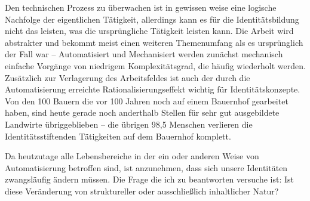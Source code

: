 Den technischen Prozess zu überwachen ist in gewissen weise eine logische Nachfolge der eigentlichen Tätigkeit, allerdings kann es für die Identitätsbildung nicht das leisten, was die ursprüngliche Tätigkeit leisten kann.
Die Arbeit wird abstrakter und bekommt meist einen weiteren Themenumfang als es ursprünglich der Fall war \parencite{ulrich} – Automatisiert und Mechanisiert werden zunächst mechanisch einfache Vorgänge von niedrigem Komplexitätsgrad, die häufig wiederholt werden.
Zusätzlich zur Verlagerung des Arbeitsfeldes ist auch der durch die Automatisierung erreichte Rationalisierungseffekt wichtig für Identitätskonzepte.
Von den 100 Bauern die vor 100 Jahren noch auf einem Bauernhof gearbeitet haben, sind heute gerade noch anderthalb Stellen für sehr gut ausgebildete Landwirte übriggeblieben \parencite{arbeitsfrei} – die übrigen 98,5 Menschen verlieren die Identitätsstiftenden Tätigkeiten auf dem Bauernhof komplett.

Da heutzutage alle Lebensbereiche in der ein oder anderen Weise von Automatisierung betroffen sind, ist anzunehmen, dass sich unsere Identitäten zwangsläufig ändern müssen.
Die Frage die ich zu beantworten versuche ist: Ist diese Veränderung von struktureller oder ausschließlich inhaltlicher Natur?

